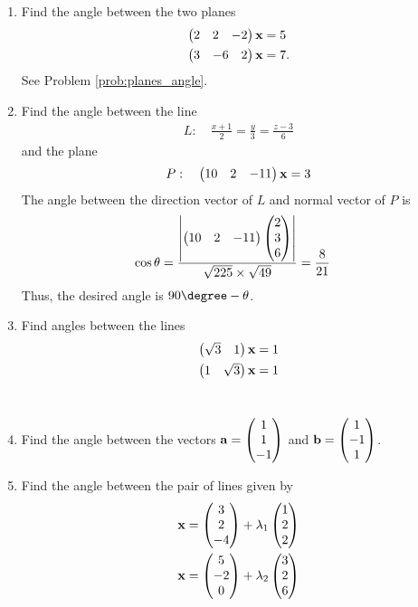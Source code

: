 \documentclass[journal,12pt,twocolumn]{IEEEtran}
\renewcommand\thesection{\arabic{section}}
\begin{document}
\begin{enumerate}[label=\thesection.\arabic*.,ref=\thesection.\theenumi]
\item Find the angle between the two planes
\begin{align}
\begin{pmatrix}2 & 2 & -2\end{pmatrix}\mathbf{x}&=5
\\
\begin{pmatrix}3 &-6 & 2\end{pmatrix}\mathbf{x}&=7.
\end{align}
%
\solution See Problem \eqref{prob:planes_angle}.
%
\item Find the angle between the line 
%
\begin{align}
L: \quad \frac{x+1}{2} = \frac{y}{3} = \frac{z-3}{6} 
\end{align}
%
and
%
the plane 
\begin{align}
P: \quad \begin{pmatrix}10 & 2 & -11\end{pmatrix}\mathbf{x}=3
\end{align}
%
\label{prob:plane_angle_line}
%
\solution The angle between the direction vector of $L$ and normal vector of $P$ is 
%
\begin{align}
\cos \theta &= \frac{\left\vert\begin{pmatrix}10 & 2 & -11\end{pmatrix}\begin{pmatrix}2\\3\\6\end{pmatrix}\right\vert}{\sqrt{225}\times \sqrt{49}} = \frac{8}{21}
\end{align}
%
Thus, the desired angle is $90\degree -\theta$.
\item Find angles between the lines
\begin{align}
\begin{pmatrix}\sqrt{3} & 1\end{pmatrix}\mathbf{x} &= 1
\\
\begin{pmatrix}1 & \sqrt{3}\end{pmatrix}\mathbf{x} &= 1
\end{align}
\\
\solution

\item Find the angle between the vectors 
$\mathbf{a}=\begin{pmatrix}1\\1\\-1\end{pmatrix}$
  and 
$\mathbf{b}=\begin{pmatrix}1\\-1\\1\end{pmatrix}$.
%
\\
\solution 

%
\item Find the angle between the pair of lines given by 
\begin{align}
\vec{x} &= \myvec{3\\2\\-4} + \lambda_1\myvec{1 \\ 2 \\2}
\\
\vec{x} &= \myvec{5\\-2\\0} + \lambda_2\myvec{3 \\ 2 \\6}

\end{align}
\end{enumerate}
\end{document}
